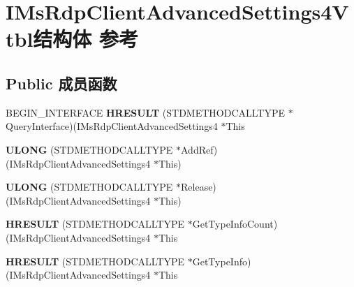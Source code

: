 \hypertarget{struct_i_ms_rdp_client_advanced_settings4_vtbl}{}\section{I\+Ms\+Rdp\+Client\+Advanced\+Settings4\+Vtbl结构体 参考}
\label{struct_i_ms_rdp_client_advanced_settings4_vtbl}
\subsection*{Public 成员函数}
\begin{DoxyCompactItemize}
\item 
\mbox{\label{struct_i_ms_rdp_client_advanced_settings4_vtbl_a9526bd52239d58b792664d87ef74cf61}} 
B\+E\+G\+I\+N\+\_\+\+I\+N\+T\+E\+R\+F\+A\+CE {\bfseries H\+R\+E\+S\+U\+LT} (S\+T\+D\+M\+E\+T\+H\+O\+D\+C\+A\+L\+L\+T\+Y\+PE $\ast$Query\+Interface)(I\+Ms\+Rdp\+Client\+Advanced\+Settings4 $\ast$This
\item 
\mbox{\label{struct_i_ms_rdp_client_advanced_settings4_vtbl_afe0cd3c7de0a672f9d996d3308df8821}} 
{\bfseries U\+L\+O\+NG} (S\+T\+D\+M\+E\+T\+H\+O\+D\+C\+A\+L\+L\+T\+Y\+PE $\ast$Add\+Ref)(I\+Ms\+Rdp\+Client\+Advanced\+Settings4 $\ast$This)
\item 
\mbox{\label{struct_i_ms_rdp_client_advanced_settings4_vtbl_a6920863e7bdb34af92ed39743c07f362}} 
{\bfseries U\+L\+O\+NG} (S\+T\+D\+M\+E\+T\+H\+O\+D\+C\+A\+L\+L\+T\+Y\+PE $\ast$Release)(I\+Ms\+Rdp\+Client\+Advanced\+Settings4 $\ast$This)
\item 
\mbox{\label{struct_i_ms_rdp_client_advanced_settings4_vtbl_a4c82a9ea310093a7e7f92839d0077c5f}} 
{\bfseries H\+R\+E\+S\+U\+LT} (S\+T\+D\+M\+E\+T\+H\+O\+D\+C\+A\+L\+L\+T\+Y\+PE $\ast$Get\+Type\+Info\+Count)(I\+Ms\+Rdp\+Client\+Advanced\+Settings4 $\ast$This
\item 
\mbox{\label{struct_i_ms_rdp_client_advanced_settings4_vtbl_adceb0e181ed98e2abe46c51f7f507bdf}} 
{\bfseries H\+R\+E\+S\+U\+LT} (S\+T\+D\+M\+E\+T\+H\+O\+D\+C\+A\+L\+L\+T\+Y\+PE $\ast$Get\+Type\+Info)(I\+Ms\+Rdp\+Client\+Advanced\+Settings4 $\ast$This

\end{DoxyCompactItemize}
